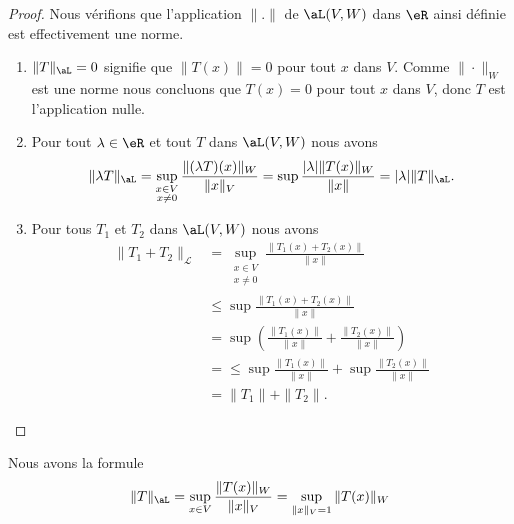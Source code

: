 \begin{proof}
	Nous vérifions que l'application \( \| . \|\) de \( \aL(V,W)\) dans \( \eR\) ainsi définie est effectivement une norme.
	\begin{enumerate}
		\item
		      \( \|T\|_{\aL}=0\) signifie que \( \|T(x)\|=0\) pour tout \( x\) dans \( V\). Comme  \( \|\cdot\|_W\) est une norme nous concluons que \( T(x)=0\) pour tout \( x\) dans \( V\), donc \( T\) est l'application nulle.
		\item
		      Pour tout \( \lambda\in \eR\) et tout  \( T\) dans \( \aL(V,W)\) nous avons
		      \begin{equation}
			      \| \lambda T \|_{\aL}=\sup_{\substack{x\in V\\x\neq 0}}\frac{ \| (\lambda T)(x) \|_W }{ \| x \|_V }=\sup\frac{ | \lambda |\| T(x) \|_W }{ \| x \| }=| \lambda |\| T \|_{\aL}.
		      \end{equation}
		\item
		      Pour tous \( T_1\) et \( T_2\) dans \( \aL(V,W)\) nous avons
		      \begin{subequations}
			      \begin{align}
				      \|T_1+ T_2\|_{\mathcal{L}} & =\sup_{\substack{x\in V                                                               \\x\neq 0}}\frac{ \| T_1(x)+T_2(x) \| }{ \| x \| }\\
				                                 & \leq \sup\frac{ \| T_1(x)+T_2(x) \| }{ \| x \| }                                      \\
				                                 & =\sup\left( \frac{ \| T_1(x) \| }{ \| x \| }+\frac{ \| T_2(x) \| }{ \| x \| } \right) \\
				                                 & =\leq\sup\frac{ \| T_1(x) \| }{ \| x \| }+\sup\frac{ \| T_2(x) \| }{ \| x \| }        \\
				                                 & =\| T_1 \|+\| T_2 \|.
			      \end{align}
		      \end{subequations}
	\end{enumerate}
\end{proof}

\begin{proposition}	\label{PROPooWHJCooXxCSWp}
	Nous avons la formule
	\begin{equation}    \label{EqFZPooIoecGH}
		\| T \|_{\aL}=\sup_{x\in V}\frac{\|T(x)\|_{W}}{\|x\|_{V}} =\sup_{\|x\|_{V}=1}\|T(x)\|_{W}
	\end{equation}
\end{proposition}


